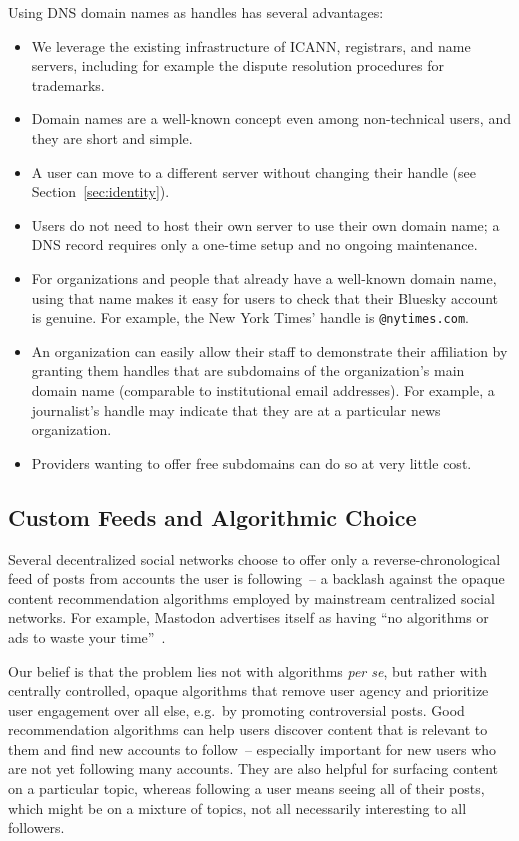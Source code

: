 \documentclass[sigconf,review]{acmart}
\begin{document}
Using DNS domain names as handles has several advantages:
\begin{itemize}
    \item We leverage the existing infrastructure of ICANN, registrars, and name servers, including for example the dispute resolution procedures for trademarks.
    \item Domain names are a well-known concept even among non-technical users, and they are short and simple.
    \item A user can move to a different server without changing their handle (see Section~\ref{sec:identity}).
    \item Users do not need to host their own server to use their own domain name; a DNS record requires only a one-time setup and no ongoing maintenance.
    \item For organizations and people that already have a well-known domain name, using that name makes it easy for users to check that their Bluesky account is genuine. For example, the New York Times' handle is \texttt{@nytimes.com}.
    \item An organization can easily allow their staff to demonstrate their affiliation by granting them handles that are subdomains of the organization's main domain name (comparable to institutional email addresses). For example, a journalist's handle may indicate that they are at a particular news organization.
    \item Providers wanting to offer free subdomains can do so at very little cost.
\end{itemize}

\subsection{Custom Feeds and Algorithmic Choice}\label{sec:feeds}

Several decentralized social networks choose to offer only a reverse-chronological feed of posts from accounts the user is following~-- a backlash against the opaque content recommendation algorithms employed by mainstream centralized social networks.
For example, Mastodon advertises itself as having ``no algorithms or ads to waste your time''~\cite{Mastodon}.

Our belief is that the problem lies not with algorithms \emph{per se}, but rather with centrally controlled, opaque algorithms that remove user agency and prioritize user engagement over all else, e.g.\ by promoting controversial posts.
Good recommendation algorithms can help users discover content that is relevant to them and find new accounts to follow~-- especially important for new users who are not yet following many accounts.
They are also helpful for surfacing content on a particular topic, whereas following a user means seeing all of their posts, which might be on a mixture of topics, not all necessarily interesting to all followers.
\end{document}
